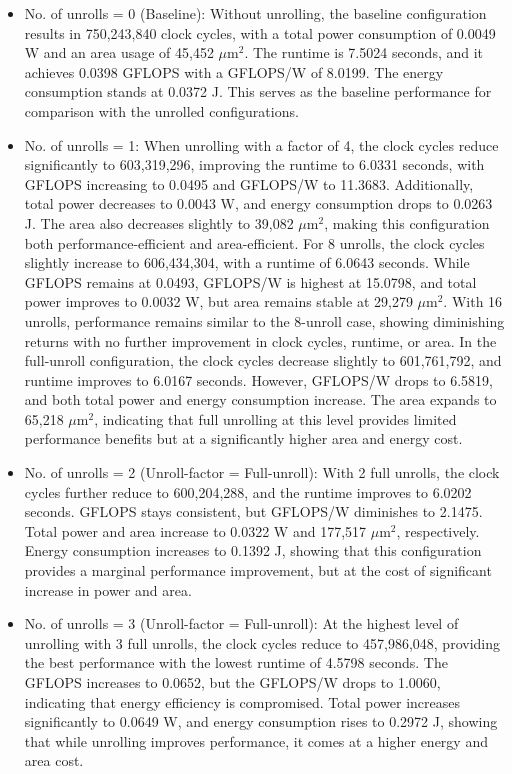 \begin{itemize}
    \item No. of unrolls = 0 (Baseline): Without unrolling, the baseline configuration results in 750,243,840 clock cycles, with a total power consumption of 0.0049 W and an area usage of 45,452 $\mu\text{m}^2$. The runtime is 7.5024 seconds, and it achieves 0.0398 GFLOPS with a GFLOPS/W of 8.0199. The energy consumption stands at 0.0372 J. This serves as the baseline performance for comparison with the unrolled configurations.
    \item No. of unrolls = 1: When unrolling with a factor of 4, the clock cycles reduce significantly to 603,319,296, improving the runtime to 6.0331 seconds, with GFLOPS increasing to 0.0495 and GFLOPS/W to 11.3683. Additionally, total power decreases to 0.0043 W, and energy consumption drops to 0.0263 J. The area also decreases slightly to 39,082 $\mu\text{m}^2$, making this configuration both performance-efficient and area-efficient. For 8 unrolls, the clock cycles slightly increase to 606,434,304, with a runtime of 6.0643 seconds. While GFLOPS remains at 0.0493, GFLOPS/W is highest at 15.0798, and total power improves to 0.0032 W, but area remains stable at 29,279 $\mu\text{m}^2$. With 16 unrolls, performance remains similar to the 8-unroll case, showing diminishing returns with no further improvement in clock cycles, runtime, or area. In the full-unroll configuration, the clock cycles decrease slightly to 601,761,792, and runtime improves to 6.0167 seconds. However, GFLOPS/W drops to 6.5819, and both total power and energy consumption increase. The area expands to 65,218 $\mu\text{m}^2$, indicating that full unrolling at this level provides limited performance benefits but at a significantly higher area and energy cost.
    \item No. of unrolls = 2 (Unroll-factor = Full-unroll): With 2 full unrolls, the clock cycles further reduce to 600,204,288, and the runtime improves to 6.0202 seconds. GFLOPS stays consistent, but GFLOPS/W diminishes to 2.1475. Total power and area increase to 0.0322 W and 177,517 $\mu\text{m}^2$, respectively. Energy consumption increases to 0.1392 J, showing that this configuration provides a marginal performance improvement, but at the cost of significant increase in power and area.
    \item No. of unrolls = 3 (Unroll-factor = Full-unroll): At the highest level of unrolling with 3 full unrolls, the clock cycles reduce to 457,986,048, providing the best performance with the lowest runtime of 4.5798 seconds. The GFLOPS increases to 0.0652, but the GFLOPS/W drops to 1.0060, indicating that energy efficiency is compromised. Total power increases significantly to 0.0649 W, and energy consumption rises to 0.2972 J, showing that while unrolling improves performance, it comes at a higher energy and area cost.
\end{itemize}

